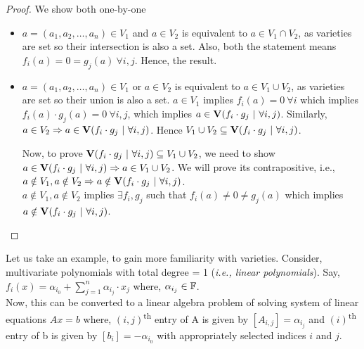 \documentclass[a4paper,11pt]{article}
\begin{document}
\begin{proof}
We show both one-by-one
\begin{itemize}
    \item $a = (a_1, a_2, \ldots, a_n)\in V_1$ and $a \in V_2$ is equivalent to $a \in V_1 \cap V_2$, as varieties are set so their intersection is also a set. Also, both the statement means $f_i(a)=0=g_j(a)\ \forall i,j$. Hence, the result.

    \item $a = (a_1, a_2, \ldots, a_n)\in V_1$ or $a \in V_2$ is equivalent to $a \in V_1 \cup V_2$, as varieties are set so their union is also a set. $a \in V_1 $ implies $f_i(a)=0\ \forall i$ which implies $f_i(a)\cdot g_j(a)=0\ \forall i, j$, which implies $a\in\V(f_i\cdot g_j \ | \ \forall i,j)$. Similarly, $a \in V_2 \Rightarrow a \in \textbf{V}(f_i\cdot g_j \ | \ \forall i,j)$. Hence $V_1 \cup V_2 \subseteq \V(f_i\cdot g_j \ | \ \forall i,j)$.

    Now, to prove $\V(f_i\cdot g_j \ | \ \forall i,j) \subseteq V_1 \cup V_2$, we need to show $a\in \textbf{V}(f_i\cdot g_j \ | \ \forall i,j) \Rightarrow a\in V_1 \cup V_2$. We will prove its contrapositive, i.e., $a\notin V_1, a\notin V_2 \Rightarrow a\notin \textbf{V}(f_i\cdot g_j \ | \ \forall i,j)$.\\
    $a\notin V_1, a\notin V_2$ implies $\exists f_i, g_j$ such that $f_i(a)\neq0\neq g_j(a)$ which implies $a\notin \V(f_i\cdot g_j \ | \ \forall i,j)$.
\end{itemize}
\end{proof}
Let us take an example, to gain more familiarity with varieties. Consider, multivariate polynomials with total degree = 1 (\emph{i.e., linear polynomials}). Say, $f_i(x) = \alpha_{i_0}+\displaystyle\sum_{j=1}^{n} \alpha_{i_j}\cdot x_j$ where, $\alpha_{i_j} \in \mathbb{F}$.\\
Now, this can be converted to a linear algebra problem of solving system of linear equations $Ax=b$ where, $(i,j)$\textsuperscript{th} entry of A is given by $[A_{i,j}] = \alpha_{i_j}$ and  $(i)$\textsuperscript{th} entry of b is given by $[b_{i}]=-\alpha_{i_0}$ with appropriately selected indices $i$ and $j$.
\end{document}
